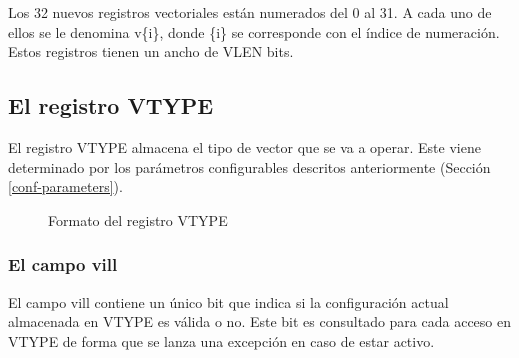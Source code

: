 Los 32 nuevos registros vectoriales están numerados del 0 al 31. A cada uno de
ellos se le denomina v\{i\}, donde \{i\} se corresponde con el índice de
numeración. Estos registros tienen un ancho de VLEN bits.


\subsection{El registro VTYPE}\label{vtype-register}

El registro VTYPE almacena el tipo de vector que se va a operar. Este viene determinado por los parámetros configurables descritos anteriormente (Sección \ref{conf-parameters}).

\begin{figure}[H]
\begin{scaletikzpicturetowidth}{\textwidth}
\end{scaletikzpicturetowidth}
\caption {Formato del registro VTYPE}
\label{fig:vtype-reg-format}
\end{figure}

\subsubsection{El campo vill}
El campo vill contiene un único bit que indica si la configuración actual almacenada en VTYPE es válida o no. Este bit es consultado para cada acceso en VTYPE de forma que se lanza una excepción en caso de estar activo.

